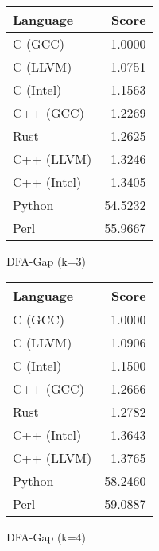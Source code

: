 \begin{subtable}{0.33\textwidth}
    \centering
    \begin{tabular}{|l|r|}
        \hline
        Language & Score \\
        \hline
        C (GCC) & 1.0000 \\
        C (LLVM) & 1.0751 \\
        C (Intel) & 1.1563 \\
        C++ (GCC) & 1.2269 \\
        Rust & 1.2625 \\
        C++ (LLVM) & 1.3246 \\
        C++ (Intel) & 1.3405 \\
        Python & 54.5232 \\
        Perl & 55.9667 \\
        \hline
    \end{tabular}
    \caption{DFA-Gap (k=3)}
    \label{table:runtime:dfa_gap(3)}
\end{subtable}%
\begin{subtable}{0.33\textwidth}
    \centering
    \begin{tabular}{|l|r|}
        \hline
        Language & Score \\
        \hline
        C (GCC) & 1.0000 \\
        C (LLVM) & 1.0906 \\
        C (Intel) & 1.1500 \\
        C++ (GCC) & 1.2666 \\
        Rust & 1.2782 \\
        C++ (Intel) & 1.3643 \\
        C++ (LLVM) & 1.3765 \\
        Python & 58.2460 \\
        Perl & 59.0887 \\
        \hline
    \end{tabular}
    \caption{DFA-Gap (k=4)}
    \label{table:runtime:dfa_gap(4)}
\end{subtable}%
